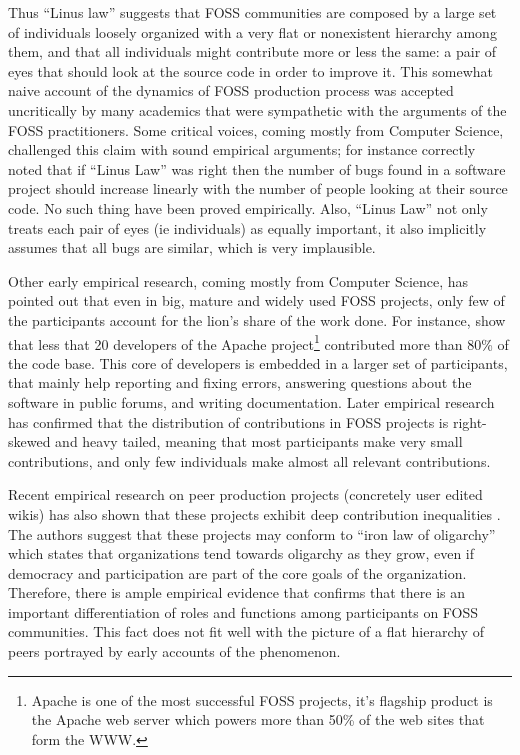 Thus ``Linus law'' suggests that FOSS communities are composed by a large set of individuals loosely organized with a very flat or nonexistent hierarchy among them, and that all individuals might contribute more or less the same: a pair of eyes that should look at the source code in order to improve it. This somewhat naive account of the dynamics of FOSS production process was accepted uncritically by many academics that were sympathetic with the arguments of the FOSS practitioners. Some critical voices, coming mostly from Computer Science, challenged this claim with sound empirical arguments; for instance \citet{glass:2002} correctly noted that if ``Linus Law'' was right then the number of bugs found in a software project should increase linearly with the number of people looking at their source code. No such thing have been proved empirically. Also, ``Linus Law'' not only treats each pair of eyes (ie individuals) as equally important, it also implicitly assumes that all bugs are similar, which is very implausible.

Other early empirical research, coming mostly from Computer Science, has pointed out that even in big, mature and widely used FOSS projects, only few of the participants account for the lion's share of the work done. For instance, \citet{mockus:2002} show that less that 20 developers of the Apache project\footnote{Apache is one of the most successful FOSS projects, it's flagship product is the Apache web server which powers more than 50\% of the web sites that form the WWW.} contributed more than 80\% of the code base. This core of developers is embedded in a larger set of participants, that mainly help reporting and fixing errors, answering questions about the software in public forums, and writing documentation. Later empirical research has confirmed that the distribution of contributions in FOSS projects is right-skewed and heavy tailed, meaning that most participants make very small contributions, and only few individuals make almost all relevant contributions.

Recent empirical research on peer production projects (concretely user edited wikis) has also shown that these projects exhibit deep contribution inequalities \citep{shaw:2014}. The authors suggest that these projects may conform to \citet{michels:1915} ``iron law of oligarchy'' which states that organizations tend towards oligarchy as they grow, even if democracy and participation are part of the core goals of the organization. Therefore, there is ample empirical evidence that confirms that there is an important differentiation of roles and functions among participants on FOSS communities. This fact does not fit well with the picture of a flat hierarchy of peers portrayed by early accounts of the phenomenon.

